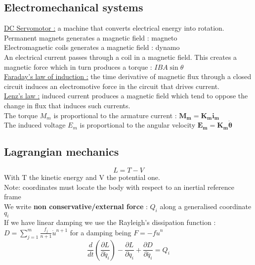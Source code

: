 \documentclass[../main.tex]{subfiles}
\begin{document}
\subsection{Electromechanical systems}
\quad \underline{DC Servomotor :} a machine that converts electrical energy into rotation.\\
Permanent magnets generates a magnetic field : magneto\\
Electromagnetic coils generates a magnetic field : dynamo\\

An electrical current passes through a coil in a magnetic field. This creates a magnetic force which in turn produces a torque : $IBA\sin{\theta}$\\

\quad \underline{Faraday's law of induction :} the time derivative of magnetic flux through a closed circuit induces an electromotive force in the circuit that drives current.\\

\quad \underline{Lenz's law :} induced current produces a magnetic field which tend to oppose the change in flux that induces such currents.\\

The torque $M_m$ is proportional to the armature current : $\mathbf{M_m = K_m i_m}$\\
The induced voltage $E_m$ is proportional to the angular velocity $\mathbf{E_m = K_m \dot{\theta}}$\\

\subsection{Lagrangian mechanics}
\begin{equation}
    L = T-V
\end{equation}
With T the kinetic energy and V the potential one.\\
\color{gray} Note: coordinates must locate the body with respect to an inertial reference frame\color{black}\\
We write \textbf{non conservative/external force} : $Q_i$ along a generalised coordinate $q_i$\\
If we have linear damping we use the Rayleigh's dissipation function : $D= \sum_{j=1}^m \frac{f_j}{n+1} \dot{u}^{n+1}$ for a damping being $F = -f \dot{u}^n$\\

\begin{equation}
    \frac{d}{dt}(\frac{\partial L}{\partial \dot{q_i}}) - \frac{\partial L}{\partial q_i} + \frac{\partial D}{\partial \dot{q_i}} = Q_i
\end{equation}
\end{document}
